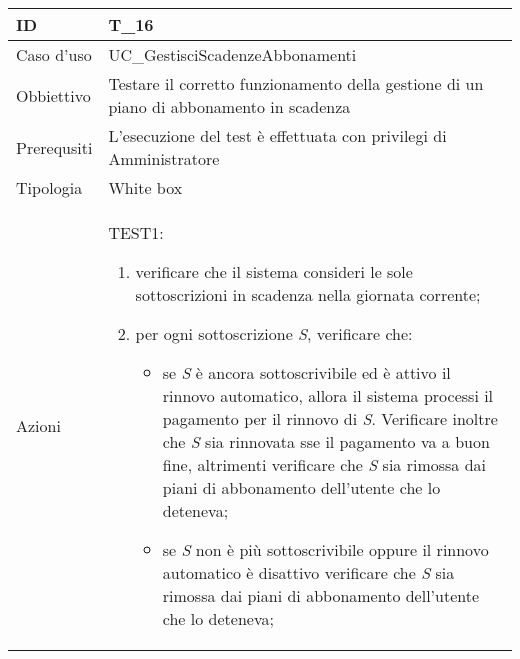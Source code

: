 \begin{table}[hb]
    \centering
    \begin{tabular}{ |p{2cm}|p{10cm}|  }
        \hline
        ID          & T\_16                                                                                   \\\hline
        Caso d'uso  & UC\_GestisciScadenzeAbbonamenti                                                         \\\hline
        Obbiettivo  & Testare il corretto funzionamento della gestione di un piano di abbonamento in scadenza \\\hline
        Prerequsiti & L'esecuzione del test è effettuata con privilegi di Amministratore                      \\\hline
        Tipologia   & White box                                                                               \\\hline
        Azioni      &
        TEST1:
        \begin{enumerate}[nosep, topsep=0pt]
            \item verificare che il sistema consideri le sole sottoscrizioni in scadenza nella giornata corrente;
            \item per ogni sottoscrizione \emph{S}, verificare che:
                  \begin{itemize}
                      \item se \emph{S} è ancora sottoscrivibile ed è attivo il rinnovo automatico, allora il sistema processi il pagamento per il rinnovo di \emph{S}. Verificare inoltre che \emph{S} sia rinnovata sse il pagamento va a buon fine, altrimenti verificare che \emph{S} sia rimossa dai piani di abbonamento dell'utente che lo deteneva;
                      \item se \emph{S} non è più sottoscrivibile oppure il rinnovo automatico è disattivo verificare che \emph{S} sia rimossa dai piani di abbonamento dell'utente che lo deteneva;
                  \end{itemize}
        \end{enumerate}

        \\\hline
    \end{tabular}
\end{table}

